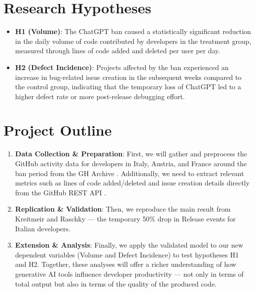 \section*{Research Hypotheses}

\begin{itemize}
  \item \textbf{H1 (Volume)}: The ChatGPT ban caused a statistically significant reduction in the daily volume of code contributed by developers in the treatment group, measured through lines of code added and deleted per user per day.
  \item \textbf{H2 (Defect Incidence)}: Projects affected by the ban experienced an increase in bug-related issue creation in the subsequent weeks compared to the control group, indicating that the temporary loss of ChatGPT led to a higher defect rate or more post-release debugging effort.
\end{itemize}


\section*{Project Outline}

\begin{enumerate}
  \item \textbf{Data Collection \& Preparation}: First, we will gather and preprocess the GitHub activity data for developers in Italy, Austria, and France around the ban period from the GH Archive \cite{github_archive}. Additionally, we need to extract relevant metrics such as lines of code added/deleted and issue creation details directly from the GitHub REST API \cite{github_api}.
  \item \textbf{Replication \& Validation}: Then, we reproduce the main result from Kreitmeir and Raschky — the temporary 50\% drop in Release events for Italian developers.
  \item \textbf{Extension \& Analysis}: Finally, we apply the validated model to our new dependent variables (Volume and Defect Incidence) to test hypotheses H1 and H2. Together, these analyses will offer a richer understanding of how generative AI tools influence developer productivity — not only in terms of total output but also in terms of the quality of the produced code.
\end{enumerate}
